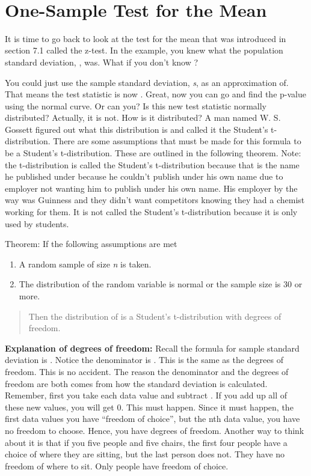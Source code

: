 \documentclass[]{book}
\begin{document}
\textbf{\\
}

\hypertarget{one-sample-test-for-the-mean}{%
\section{One-Sample Test for the Mean}\label{one-sample-test-for-the-mean}}

It is time to go back to look at the test for the mean that was
introduced in section 7.1 called the z-test. In the example, you knew
what the population standard deviation, , was. What if you don't know ?

You could just use the sample standard deviation, \emph{s}, as an
approximation of. That means the test statistic is now . Great, now you
can go and find the p-value using the normal curve. Or can you? Is this
new test statistic normally distributed? Actually, it is not. How is it
distributed? A man named W. S. Gossett figured out what this
distribution is and called it the Student's t-distribution. There are
some assumptions that must be made for this formula to be a Student's
t-distribution. These are outlined in the following theorem. Note: the
t-distribution is called the Student's t-distribution because that is
the name he published under because he couldn't publish under his own
name due to employer not wanting him to publish under his own name. His
employer by the way was Guinness and they didn't want competitors
knowing they had a chemist working for them. It is not called the
Student's t-distribution because it is only used by students.

Theorem: If the following assumptions are met

\begin{enumerate}
\def\labelenumi{\alph{enumi}.}
\item
  A random sample of size \emph{n} is taken.
\item
  The distribution of the random variable is normal or the sample size
  is 30 or more.
\end{enumerate}

\begin{quote}
Then the distribution of is a Student's t-distribution with degrees of
freedom.
\end{quote}

\textbf{Explanation of degrees of freedom:} Recall the formula for sample
standard deviation is . Notice the denominator is . This is the same as
the degrees of freedom. This is no accident. The reason the denominator
and the degrees of freedom are both comes from how the standard
deviation is calculated. Remember, first you take each data value and
subtract . If you add up all of these new values, you will get 0. This
must happen. Since it must happen, the first data values you have
``freedom of choice'', but the nth data value, you have no freedom to
choose. Hence, you have degrees of freedom. Another way to think about
it is that if you five people and five chairs, the first four people
have a choice of where they are sitting, but the last person does not.
They have no freedom of where to sit. Only people have freedom of
choice.
\end{document}
